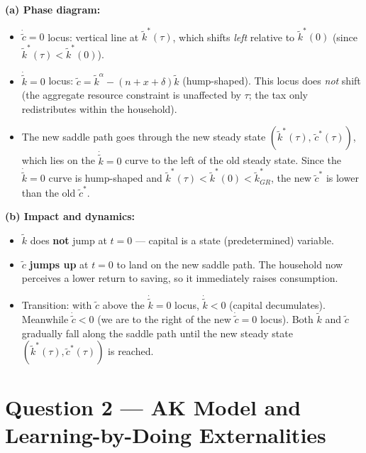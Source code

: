 \documentclass[a4paper,11pt]{article}
\newcommand{\ktilde}{\tilde{k}}
\newcommand{\ctilde}{\tilde{c}}
\begin{document}
\begin{answerbox}
\textbf{(a) Phase diagram:}

\begin{itemize}
    \item $\dot{\ctilde}=0$ locus: vertical line at $\ktilde^*(\tau)$, which shifts
    \emph{left} relative to $\ktilde^*(0)$ (since $\ktilde^*(\tau) < \ktilde^*(0)$).
    \item $\dot{\ktilde}=0$ locus: $\ctilde = \ktilde^{\alpha} - (n+x+\delta)\ktilde$
    (hump-shaped).  This locus does \emph{not} shift (the aggregate resource constraint
    is unaffected by $\tau$; the tax only redistributes within the household).
    \item The new saddle path goes through the new steady state
    $(\ktilde^*(\tau),\,\ctilde^*(\tau))$, which lies on the $\dot{\ktilde}=0$ curve
    to the left of the old steady state.  Since the $\dot{\ktilde}=0$ curve is
    hump-shaped and $\ktilde^*(\tau) < \ktilde^*(0) < \ktilde^*_{GR}$, the new $\ctilde^*$
    is lower than the old $\ctilde^*$.
\end{itemize}

\textbf{(b) Impact and dynamics:}
\begin{itemize}
    \item $\ktilde$ does \textbf{not} jump at $t=0$ --- capital is a state (predetermined)
    variable.
    \item $\ctilde$ \textbf{jumps up} at $t=0$ to land on the new saddle path.  The
    household now perceives a lower return to saving, so it immediately raises
    consumption.
    \item Transition: with $\ctilde$ above the $\dot{\ktilde}=0$ locus,
    $\dot{\ktilde} < 0$ (capital decumulates).  Meanwhile $\dot{\ctilde} < 0$ (we are
    to the right of the new $\dot{\ctilde}=0$ locus).  Both $\ktilde$ and $\ctilde$
    gradually fall along the saddle path until the new steady state
    $(\ktilde^*(\tau),\ctilde^*(\tau))$ is reached.
\end{itemize}
\end{answerbox}

\clearpage
\section{Question 2 --- AK Model and Learning-by-Doing Externalities}
\end{document}
